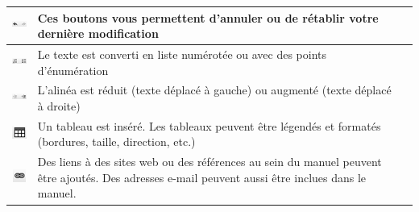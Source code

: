 \begin{tabular}{c | p{14cm} l}
\hline
\includegraphics[height=12pt]{../chapters/09_Qualitaetsmanagement/pictures/Format/Undo.jpg} & Ces boutons vous permettent d'annuler ou de rétablir votre dernière modification \\
\hline
\includegraphics[height=12pt]{../chapters/09_Qualitaetsmanagement/pictures/Format/Aufzaehlung.jpg} & Le texte est converti en liste numérotée ou avec des points d'énumération  \\
\hline
\includegraphics[height=12pt]{../chapters/09_Qualitaetsmanagement/pictures/Format/Einruecken.jpg} & L'alinéa est réduit (texte déplacé à gauche) ou augmenté (texte déplacé à droite) \\
\hline
\includegraphics[height=12pt]{../chapters/09_Qualitaetsmanagement/pictures/Format/Tabellen.jpg} & Un tableau est inséré. Les tableaux peuvent être légendés et formatés (bordures, taille, direction, etc.) \\
\hline
\includegraphics[height=12pt]{../chapters/09_Qualitaetsmanagement/pictures/Format/Link.jpg} & Des liens à des sites web ou des références au sein du manuel peuvent être ajoutés. Des adresses e-mail peuvent aussi être inclues dans le manuel. \\
\hline
\end{tabular}





